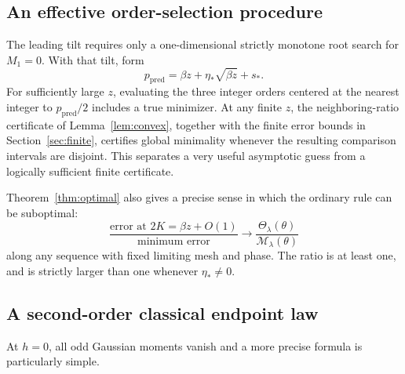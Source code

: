 \documentclass[11pt,a4paper]{article}
\numberwithin{equation}{section}
\theoremstyle{definition}\newtheorem{definition}[theorem]{Definition}
\theoremstyle{remark}\newtheorem{remark}[theorem]{Remark}
\newcommand{\calM}{\mathcal M}
\begin{document}
\subsection{An effective order-selection procedure}
The leading tilt requires only a one-dimensional strictly monotone root
search for $M_1=0$. With that tilt, form
\begin{equation}
 p_{\mathrm{pred}}=\beta z+\eta_*\sqrt{\beta z}+s_*.
 \label{eq:prediction}
\end{equation}
For sufficiently large $z$, evaluating the three integer orders centered
at the nearest integer to $p_{\mathrm{pred}}/2$ includes a true minimizer.
At any finite $z$, the neighboring-ratio certificate of
Lemma~\ref{lem:convex}, together with the finite error bounds in
Section~\ref{sec:finite}, certifies global minimality whenever the
resulting comparison intervals are disjoint. This separates a very useful
asymptotic guess from a logically sufficient finite certificate.

Theorem~\ref{thm:optimal} also gives a precise sense in which the ordinary
rule can be suboptimal:
\begin{equation}
 \frac{\text{error at }2K=\beta z+O(1)}{\text{minimum error}}
 \longrightarrow
 \frac{\Theta_\lambda(\theta)}{\calM_\lambda(\theta)}
 \label{eq:gain}
\end{equation}
along any sequence with fixed limiting mesh and phase. The ratio is at
least one, and is strictly larger than one whenever $\eta_*\ne0$.

\subsection{A second-order classical endpoint law}
At $h=0$, all odd Gaussian moments vanish and a more precise formula is
particularly simple.
\end{document}
